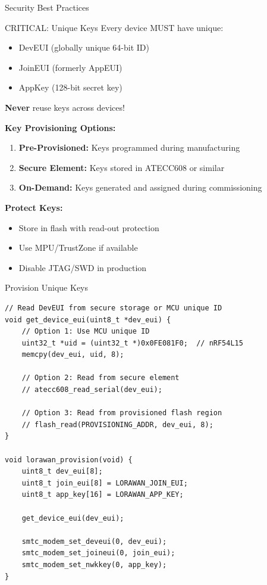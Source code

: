 \documentclass{beamer}
\begin{document}
\begin{frame}{Security Best Practices}
\begin{alertblock}{CRITICAL: Unique Keys}
Every device MUST have unique:
\begin{itemize}
    \item DevEUI (globally unique 64-bit ID)
    \item JoinEUI (formerly AppEUI)
    \item AppKey (128-bit secret key)
\end{itemize}
\textbf{Never} reuse keys across devices!
\end{alertblock}

\vspace{0.3cm}

\textbf{Key Provisioning Options:}
\begin{enumerate}
    \item \textbf{Pre-Provisioned:} Keys programmed during manufacturing
    \item \textbf{Secure Element:} Keys stored in ATECC608 or similar
    \item \textbf{On-Demand:} Keys generated and assigned during commissioning
\end{enumerate}

\vspace{0.3cm}

\textbf{Protect Keys:}
\begin{itemize}
    \item Store in flash with read-out protection
    \item Use MPU/TrustZone if available
    \item Disable JTAG/SWD in production
\end{itemize}
\end{frame}

\begin{frame}[fragile]{Provision Unique Keys}
\begin{lstlisting}[caption={Key Provisioning Example}]
// Read DevEUI from secure storage or MCU unique ID
void get_device_eui(uint8_t *dev_eui) {
    // Option 1: Use MCU unique ID
    uint32_t *uid = (uint32_t *)0x0FE081F0;  // nRF54L15
    memcpy(dev_eui, uid, 8);

    // Option 2: Read from secure element
    // atecc608_read_serial(dev_eui);

    // Option 3: Read from provisioned flash region
    // flash_read(PROVISIONING_ADDR, dev_eui, 8);
}

void lorawan_provision(void) {
    uint8_t dev_eui[8];
    uint8_t join_eui[8] = LORAWAN_JOIN_EUI;
    uint8_t app_key[16] = LORAWAN_APP_KEY;

    get_device_eui(dev_eui);

    smtc_modem_set_deveui(0, dev_eui);
    smtc_modem_set_joineui(0, join_eui);
    smtc_modem_set_nwkkey(0, app_key);
}
\end{lstlisting}
\end{frame}
\end{document}
